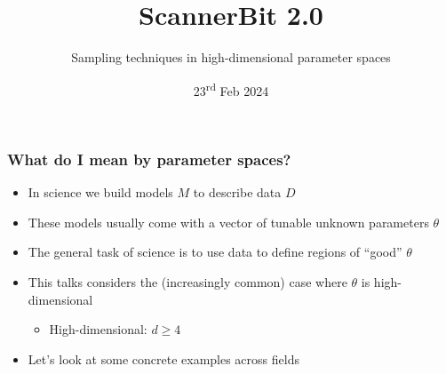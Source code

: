 \documentclass[aspectratio=169]{beamer}
\title{ScannerBit 2.0}
\subtitle{Sampling techniques in high-dimensional parameter spaces}
\date{23\textsuperscript{rd} Feb 2024}
\begin{document}
\begin{frame}
    \titlepage
\end{frame}

\begin{frame}
    \frametitle{What do I mean by parameter spaces?}
    \begin{itemize}
        \item In science we build models $M$ to describe data $D$
        \item These models usually come with a vector of tunable unknown parameters $\theta$
        \item The general task of science is to use data to define regions of ``good'' $\theta$
        \item This talks considers the (increasingly common) case where $\theta$ is high-dimensional
            \begin{itemize}
                \item High-dimensional: $d\ge4$
            \end{itemize}
        \item Let's look at some concrete examples across fields
    \end{itemize}
\end{frame}
\end{document}
